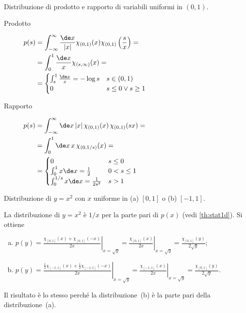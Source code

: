 \begin{ex}
	Distribuzione di prodotto e rapporto di variabili uniformi in $(0,1)$.
\end{ex}

\begin{solution}
	\begin{description}
		\item[Prodotto]
			$\begin{aligned}[t]
				p(s) &= \int_{-\infty}^\infty \frac{\de x}{|x|} \chi_{(0,1)}(x)\chi_{(0,1)}\left(\frac sx\right) = \\
				&= \int_0^1 \frac{\de x}{x} \chi_{(s,\infty)}(x) = \\
				&= \begin{cases}
					\int_s^1\frac{\de x}x = -\log s & s \in (0,1) \\
					0 & s \le 0 \vee s \ge 1
				\end{cases}
			\end{aligned}$
		\item[Rapporto]
			$\begin{aligned}[t]
				p(s) &= \int_{-\infty}^\infty \de x\,|x|\,\chi_{(0,1)}(x)\,\chi_{(0,1)}(sx) = \\
				&= \int_0^1 \de x\,x\,\chi_{(0,1/s)}(x) = \\
				&= \begin{cases}
					0 & s \le 0 \\
					\int_0^1 x\de x = \frac12 & 0 < s \le 1 \\
					\int_0^{1/s} x\de x = \frac1{2s^2} & s > 1
				\end{cases}
			\end{aligned}$
	\end{description}
\end{solution}

\begin{ex}
	Distribuzione di $y=x^2$ con $x$ uniforme in (a) $[0,1]$ o (b) $[-1,1]$.
\end{ex}

\begin{solution}
	La distribuzione di $y=x^2$ è $1/x$ per la parte pari di $p(x)$ (vedi \autoref{th:stat1d}). Si ottiene
	\begin{enumerate}[(a)]
		\item
			$\displaystyle p(y) = \left.\frac{\chi_{[0,1]}(x) + \chi_{[0,1]}(-x)}{2x}\right|_{x=\sqrt y}
			= \left.\frac{\chi_{[0,1]}(x)}{2x}\right|_{x=\sqrt y}
			= \frac{\chi_{[0,1]}(y)}{2\sqrt y};$
		\item
			$\displaystyle p(y) = \left.\frac{\frac12\chi_{[-1,1]}(x) + \frac12\chi_{[-1,1]}(-x)}{2x}\right|_{x=\sqrt y}
			= \left.\frac{\chi_{[-1,1]}(x)}{2x}\right|_{x=\sqrt y}
			= \frac{\chi_{[0,1]}(y)}{2\sqrt y}.$
	\end{enumerate}
	Il risultato è lo stesso perché la distribuzione~(b) è la parte pari della distribuzione~(a).
\end{solution}
